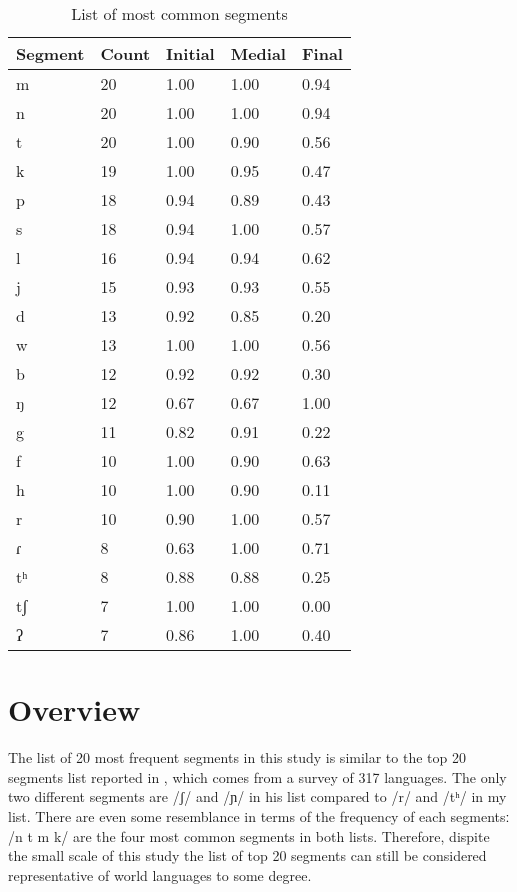 \begin{table}[]
\centering
\caption{List of most common segments}
\label{tab:segment_list}
\begin{tabular}{|l|l|l|l|l|}
\hline
Segment & Count & Initial & Medial & Final \\ \hline
m        & 20    & 1.00    & 1.00   & 0.94  \\ \hline
n        & 20    & 1.00    & 1.00   & 0.94  \\ \hline
t        & 20    & 1.00    & 0.90   & 0.56  \\ \hline
k        & 19    & 1.00    & 0.95   & 0.47  \\ \hline
p        & 18    & 0.94    & 0.89   & 0.43  \\ \hline
s        & 18    & 0.94    & 1.00   & 0.57  \\ \hline
l        & 16    & 0.94    & 0.94   & 0.62  \\ \hline
j        & 15    & 0.93    & 0.93   & 0.55  \\ \hline
d        & 13    & 0.92    & 0.85   & 0.20  \\ \hline
w        & 13    & 1.00    & 1.00   & 0.56  \\ \hline
b        & 12    & 0.92    & 0.92   & 0.30  \\ \hline
ŋ        & 12    & 0.67    & 0.67   & 1.00  \\ \hline
g        & 11    & 0.82    & 0.91   & 0.22  \\ \hline
f        & 10    & 1.00    & 0.90   & 0.63  \\ \hline
h        & 10    & 1.00    & 0.90   & 0.11  \\ \hline
r        & 10    & 0.90    & 1.00   & 0.57  \\ \hline
ɾ        & 8     & 0.63    & 1.00   & 0.71  \\ \hline
tʰ       & 8     & 0.88    & 0.88   & 0.25  \\ \hline
tʃ       & 7     & 1.00    & 1.00   & 0.00  \\ \hline
ʔ        & 7     & 0.86    & 1.00   & 0.40  \\ \hline
\end{tabular}
\end{table}

\section{Overview}
The list of 20 most frequent segments in this study is similar to the top 20 segments list reported in \citet[45]{Gordon_2016}, which comes from a survey of 317 languages. The only two different segments are /ʃ/ and /ɲ/ in his list compared to /r/ and /tʰ/ in my list. There are even some resemblance in terms of the frequency of each segmentsː /n t m k/ are the four most common segments in both lists. Therefore, dispite the small scale of this study the list of top 20 segments can still be considered representative of world languages to some degree. 

